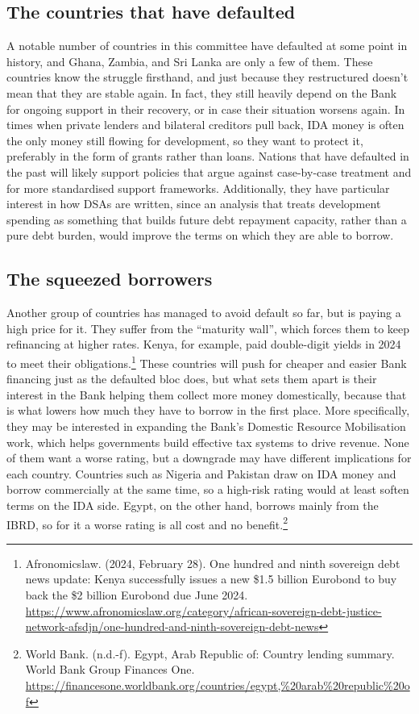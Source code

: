 \subsection{The countries that have defaulted}

A notable number of countries in this committee have defaulted at some point in history, and Ghana, Zambia, and Sri Lanka are only a few of them. These countries know the struggle firsthand, and just because they restructured doesn’t mean that they are stable again. In fact, they still heavily depend on the Bank for ongoing support in their recovery, or in case their situation worsens again. In times when private lenders and bilateral creditors pull back, IDA money is often the only money still flowing for development, so they want to protect it, preferably in the form of grants rather than loans. Nations that have defaulted in the past will likely support policies that argue against case-by-case treatment and for more standardised support frameworks. Additionally, they have particular interest in how DSAs are written, since an analysis that treats development spending as something that builds future debt repayment capacity, rather than a pure debt burden, would improve the terms on which they are able to borrow.

\subsection{The squeezed borrowers}

Another group of countries has managed to avoid default so far, but is paying a high price for it. They suffer from the “maturity wall”, which forces them to keep refinancing at higher rates. Kenya, for example, paid double-digit yields in 2024 to meet their obligations.\footnote{Afronomicslaw. (2024, February 28). One hundred and ninth sovereign debt news update: Kenya successfully issues a new \$1.5 billion Eurobond to buy back the \$2 billion Eurobond due June 2024. \url{https://www.afronomicslaw.org/category/african-sovereign-debt-justice-network-afsdjn/one-hundred-and-ninth-sovereign-debt-news}} These countries will push for cheaper and easier Bank financing just as the defaulted bloc does, but what sets them apart is their interest in the Bank helping them collect more money domestically, because that is what lowers how much they have to borrow in the first place. More specifically, they may be interested in expanding the Bank’s Domestic Resource Mobilisation work, which helps governments build effective tax systems to drive revenue. None of them want a worse rating, but a downgrade may have different implications for each country. Countries such as Nigeria and Pakistan draw on IDA money and borrow commercially at the same time, so a high-risk rating would at least soften terms on the IDA side. Egypt, on the other hand, borrows mainly from the IBRD, so for it a worse rating is all cost and no benefit.\footnote{World Bank. (n.d.-f). Egypt, Arab Republic of: Country lending summary. World Bank Group Finances One. \url{https://financesone.worldbank.org/countries/egypt,\%20arab\%20republic\%20of}}


